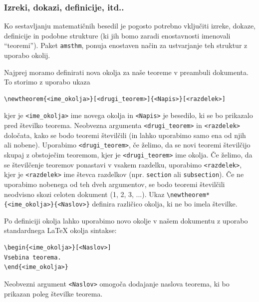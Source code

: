 \subsubsection{Izreki, dokazi, definicije, itd..}

Ko sestavljanju matematičnih besedil je pogosto potrebno vključiti izreke, dokaze, definicije in podobne strukture (ki jih bomo zaradi enostavnosti imenovali ``teoremi'').
Paket \texttt{amsthm}, ponuja enostaven način za ustvarjanje teh struktur z uporabo okolij.

Najprej moramo definirati nova okolja za naše teoreme v preambuli dokumenta.
To storimo z uporabo ukaza

\begin{verbatim}
\newtheorem{<ime_okolja>}[<drugi_teorem>]{<Napis>}[<razdelek>]
\end{verbatim}

kjer je \texttt{\textless ime\_okolja\textgreater } ime novega okolja in
\texttt{\textless Napis\textgreater } je besedilo, ki se bo prikazalo pred številko teorema.
Neobvezna argumenta \texttt{\textless drugi\_teorem\textgreater } in \texttt{\textless razdelek\textgreater } določata, kako se bodo teoremi številčili (in lahko uporabimo samo ena od njih ali nobene).
Uporabimo \texttt{\textless drugi\_teorem\textgreater }, če želimo, da se novi teoremi številčijo skupaj z obstoječim teoremom, kjer je \texttt{\textless drugi\_teorem\textgreater } ime okolja.
Če želimo, da se številčenje teoremov ponastavi v vsakem razdelku, uporabimo \texttt{\textless razdelek\textgreater }, kjer je \texttt{\textless razdelek\textgreater } ime števca razdelkov (npr. \texttt{section} ali \texttt{subsection}).
Če ne uporabimo nobenega od teh dveh argumentov, se bodo teoremi številčili neodvisno skozi celoten dokument (1, 2, 3, ...).
Ukaz \texttt{{\textbackslash}newtheorem*\{\textless ime\_okolja\textgreater \}\{\textless Naslov\textgreater \}} definira različico okolja, ki ne bo imela številke.

Po definiciji okolja lahko uporabimo novo okolje v našem dokumentu z uporabo standardnega LaTeX okolja sintakse:

\begin{verbatim}
\begin{<ime_okolja>}[<Naslov>]
Vsebina teorema.
\end{<ime_okolja>}
\end{verbatim}

Neobvezni argument \texttt{\textless Naslov\textgreater } omogoča dodajanje naslova teorema, ki bo prikazan poleg številke teorema.

